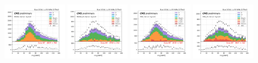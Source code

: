 \begin{figure}
    \includegraphics[width=0.24\textwidth]{chapters/Appendix/sectionQCD/figures/mutau_>=2_==0_dilepton_mass.png}
    \includegraphics[width=0.24\textwidth]{chapters/Appendix/sectionQCD/figures/mutau_ss_>=2_==0_dilepton_mass.png}
    \includegraphics[width=0.24\textwidth]{chapters/Appendix/sectionQCD/figures/etau_>=2_==0_dilepton_mass.png}
    \includegraphics[width=0.24\textwidth]{chapters/Appendix/sectionQCD/figures/etau_ss_>=2_==0_dilepton_mass.png}
    

\end{figure}
